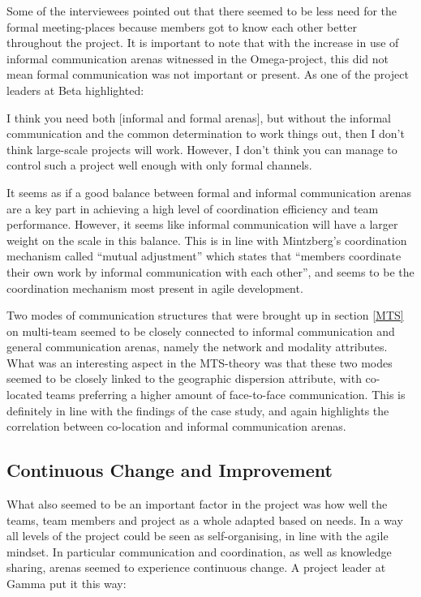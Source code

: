 Some of the interviewees pointed out that there seemed to be less need for the formal meeting-places because members got to know each other better throughout the project. It is important to note that with the increase in use of informal communication arenas witnessed in the Omega-project, this did not mean formal communication was not important or present. As one of the project leaders at Beta highlighted:

\begin{fancyquotes}
I think you need both [informal and formal arenas], but without the informal communication and the common determination to work things out, then I don't think large-scale projects will work. However, I don't think you can manage to control such a project well enough with only formal channels.
\end{fancyquotes}

It seems as if a good balance between formal and informal communication arenas are a key part in achieving a high level of coordination efficiency and team performance. However, it seems like informal communication will have a larger weight on the scale in this balance. This is in line with Mintzberg's \cite{mintzberg1989mintzberg} coordination mechanism called ``mutual adjustment'' which states that ``members coordinate their own work by informal communication with each other'', and seems to be the coordination mechanism most present in agile development.

Two modes of communication structures that were brought up in section \ref{MTS} on multi-team seemed to be closely connected to informal communication and general communication arenas, namely the network and modality attributes. What was an interesting aspect in the MTS-theory was that these two modes seemed to be closely linked to the geographic dispersion attribute, with co-located teams preferring a higher amount of face-to-face communication. This is definitely in line with the findings of the case study, and again highlights the correlation between co-location and informal communication arenas.

\subsection{Continuous Change and Improvement}

What also seemed to be an important factor in the project was how well the teams, team members and project as a whole adapted based on needs. In a way all levels of the project could be seen as self-organising, in line with the agile mindset. In particular communication and coordination, as well as knowledge sharing, arenas seemed to experience continuous change. A project leader at Gamma put it this way:

